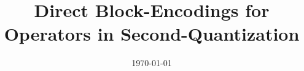 






\title{Direct Block-Encodings for Operators in Second-Quantization}


\date{\today} 

 

\maketitle











\appendix











